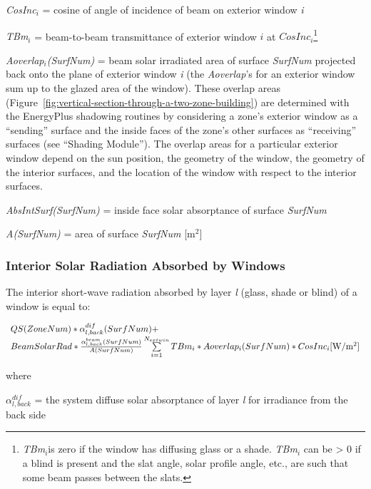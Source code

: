 \emph{CosInc\(_{i}\)} = cosine of angle of incidence of beam on exterior window \emph{i}

\emph{TBm\(_{i}\)} = beam-to-beam transmittance of exterior window \(i\) at \(CosInc_{i}\)\footnote{\emph{TBm\(_{i}\)}is zero if the window has diffusing glass or a shade. \emph{TBm\(_{i}\)} can be \textgreater{} 0 if a blind is present and the slat angle, solar profile angle, etc., are such that some beam passes between the slats.}

\emph{Aoverlap\(_{i}\)(SurfNum)} = beam solar irradiated area of surface \emph{SurfNum} projected back onto the plane of exterior window \emph{i} (the \emph{Aoverlap}'s for an exterior window sum up to the glazed area of the window). These overlap areas (Figure~\ref{fig:vertical-section-through-a-two-zone-building}) are determined with the EnergyPlus shadowing routines by considering a zone's exterior window as a ``sending'' surface and the inside faces of the zone's other surfaces as ``receiving'' surfaces (see ``Shading Module''). The overlap areas for a particular exterior window depend on the sun position, the geometry of the window, the geometry of the interior surfaces, and the location of the window with respect to the interior surfaces.

\emph{AbsIntSurf(SurfNum)} = inside face solar absorptance of surface \emph{SurfNum}

\emph{A(SurfNum)} = area of surface \emph{SurfNum} {[}m\(^{2}\){]}

\subsubsection{Interior Solar Radiation Absorbed by Windows}\label{interior-solar-radiation-absorbed-by-windows}

The interior short-wave radiation absorbed by layer \emph{l} (glass, shade or blind) of a window is equal to:

\begin{equation}
\begin{array}{l}QS(ZoneNum)*\alpha_{l,back}^{dif}(SurfNum) + \\BeamSolarRad*\frac{{\alpha_{l,back}^{beam}(SurfNum)}}{{A(SurfNum)}}\sum\limits_{i = 1}^{{N_{extwin}}} {TB{m_i}*Aoverla{p_i}(SurfNum)} *CosIn{c_i}{\rm{ [W/}}{{\rm{m}}^{\rm{2}}}]\end{array}
\end{equation}

where

\(\alpha_{l,back}^{dif}\) = the system diffuse solar absorptance of layer \emph{l} for irradiance from the back side


